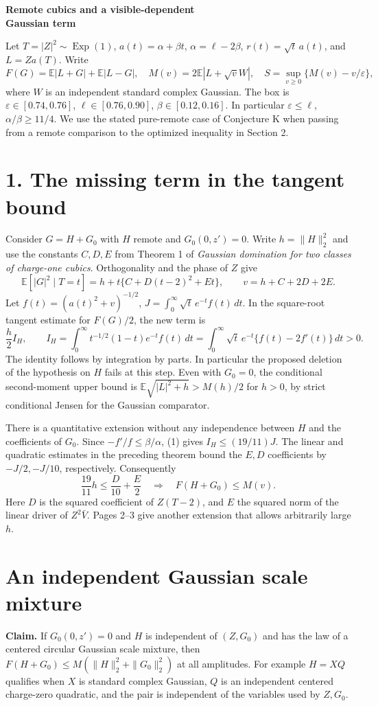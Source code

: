 \documentclass[11pt]{article}
\newcommand{\E}{\mathbb E}
\newcommand{\dd}{\,d}
\newcommand{\head}[1]{\section*{#1}}
\begin{document}
\thispagestyle{plain}
{\LARGE\bfseries Remote cubics and a visible-dependent\\[2pt] Gaussian term}\par
\medskip
Let \(T=|Z|^2\sim\operatorname{Exp}(1)\), \(a(t)=\alpha+\beta t\),
\(\alpha=\ell-2\beta\), \(r(t)=\sqrt t\,a(t)\), and \(L=Za(T)\). Write
\[
 F(G)=\E|L+G|+\E|L-G|,\quad M(v)=2\E|L+\sqrt v W|,\quad
 S=\sup_{v\ge0}\{M(v)-v/\varepsilon\},
\]
where \(W\) is an independent standard complex Gaussian. The box is
\(\varepsilon\in[0.74,0.76]\), \(\ell\in[0.76,0.90]\), \(\beta\in[0.12,0.16]\).
In particular \(\varepsilon\le\ell\), \(\alpha/\beta\ge11/4\).
We use the stated pure-remote case of Conjecture K when passing from a remote
comparison to the optimized inequality in Section 2.

\head{1. The missing term in the tangent bound}
Consider \(G=H+G_0\) with \(H\) remote and \(G_0(0,z')=0\). Write \(h=\|H\|_2^2\)
and use the constants \(C,D,E\) from Theorem 1 of \emph{Gaussian domination for
two classes of charge-one cubics}. Orthogonality and the phase of \(Z\) give
\[
 \E[|G|^2\mid T=t]=h+t\{C+D(t-2)^2+Et\},\qquad v=h+C+2D+2E .
\]
Let \(f(t)=(a(t)^2+v)^{-1/2}\), \(J=\int_0^\infty\sqrt t\,e^{-t} f(t)\dd t\).
In the square-root tangent estimate for \(F(G)/2\), the new term is
\[
 \frac h2 I_H,\qquad I_H=\int_0^\infty t^{-1/2}(1-t)e^{-t} f(t)\dd t
 =\int_0^\infty \sqrt t\,e^{-t}\{f(t)-2f'(t)\}\dd t>0.       \tag{1}
\]
The identity follows by integration by parts. In particular the proposed deletion
of the hypothesis on \(H\) fails at this step. Even with \(G_0=0\), the conditional
second-moment upper bound is \(\E\sqrt{|L|^2+h}>M(h)/2\) for \(h>0\), by strict
conditional Jensen for the Gaussian comparator.

There is a quantitative extension without any independence between \(H\) and
the coefficients of \(G_0\). Since \(-f'/f\le\beta/\alpha\), (1) gives
\(I_H\le(19/11)J\). The linear and quadratic estimates in the preceding theorem
bound the \(E,D\) coefficients by \(-J/2,-J/10\), respectively. Consequently
\[
 \boxed{\quad \frac{19}{11}h\le \frac{D}{10}+\frac E2
      \quad\Longrightarrow\quad F(H+G_0)\le M(v).\quad}       \tag{2}
\]
Here \(D\) is the squared coefficient of \(Z(T-2)\), and \(E\) the squared norm
of the linear driver of \(Z^2\bar V\). Pages 2--3 give another extension that
allows arbitrarily large \(h\).

\newpage
\head{An independent Gaussian scale mixture}
\textbf{Claim.} If \(G_0(0,z')=0\) and \(H\) is independent of \((Z,G_0)\) and
has the law of a centered circular Gaussian scale mixture, then
\(F(H+G_0)\le M(\|H\|_2^2+\|G_0\|_2^2)\) at all amplitudes.
For example \(H=XQ\) qualifies when \(X\) is standard complex Gaussian,
\(Q\) is an independent centered charge-zero quadratic, and the pair is independent
of the variables used by \(Z,G_0\).
\end{document}
